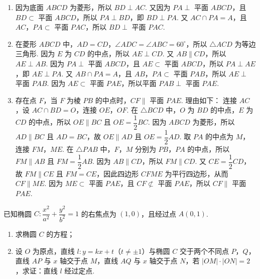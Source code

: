 \begin{solution}
\begin{enumerate}
\item 因为底面 \(ABCD\) 为菱形，所以 \(BD\perp AC\).
又因为 \(PA\perp\) 平面 \(ABCD\)，且 \(BD\subset\) 平面 \(ABCD\)，所以 \(PA\perp BD\)，即 \(BD\perp PA\).
又 \(AC\cap PA=A\)，且 \(AC\)，\(PA\subset\) 平面 \(PAC\)，所以 \(BD\perp\) 平面 \(PAC\).

\item 在菱形 \(ABCD\) 中，\(AD=CD\)，\(\angle ADC=\angle ABC=60^\circ\)，所以 \(\triangle ACD\) 为等边三角形.
因为 \(E\) 为 \(CD\) 的中点，所以 \(AE\perp CD\).
又 \(AB\parallel CD\)，所以 \(AE\perp AB\).
因为 \(PA\perp\) 平面 \(ABCD\)，且 \(AE\subset\) 平面 \(ABCD\)，所以 \(PA\perp AE\)，即 \(AE\perp PA\).
又 \(AB\cap PA=A\)，且 \(AB\)，\(PA\subset\) 平面 \(PAB\)，所以 \(AE\perp\) 平面 \(PAB\).
因为 \(AE\subset\) 平面 \(PAE\)，所以平面 \(PAB\perp\) 平面 \(PAE\).

\item 存在点 \(F\)，当 \(F\) 为棱 \(PB\) 的中点时，\(CF\parallel\) 平面 \(PAE\). 理由如下：
连接 \(AC\)，设 \(AC\cap BD=O\)，连接 \(OE\)，\(OF\).
在 \(\triangle BCD\) 中，\(O\) 为 \(BD\) 的中点，\(E\) 为 \(CD\) 的中点，所以 \(OE\parallel BC\) 且 \(OE=\dfrac12BC\).
因为 \(ABCD\) 为菱形，所以 \(AD\parallel BC\) 且 \(AD=BC\)，故 \(OE\parallel AD\) 且 \(OE=\dfrac12AD\).
取 \(PA\) 的中点为 \(M\)，连接 \(FM\)，\(ME\).
在 \(\triangle PAB\) 中，\(F\)，\(M\) 分别为 \(PB\)，\(PA\) 的中点，所以 \(FM\parallel AB\) 且 \(FM=\dfrac12AB\).
因为 \(AB\parallel CD\)，所以 \(FM\parallel CD\). 又 \(CE=\dfrac12CD\)，故 \(FM\parallel CE\) 且 \(FM=CE\)，因此四边形 \(CFME\) 为平行四边形，从而 \(CF\parallel ME\).
因为 \(ME\subset\) 平面 \(PAE\)，且 \(CF\not\subset\) 平面 \(PAE\)，所以 \(CF\parallel\) 平面 \(PAE\).
\end{enumerate}
\end{solution}

\begin{problem}
已知椭圆 \(C:\dfrac{x^2}{a^2}+\dfrac{y^2}{b^2}=1\) 的右焦点为 \((1,0)\)，且经过点 \(A(0,1)\).

\begin{enumerate}
\item 求椭圆 \(C\) 的方程；

\item 设 \(O\) 为原点，直线 \(l:y=kx+t\)（\(t\ne\pm1\)）与椭圆 \(C\) 交于两个不同点 \(P\)，\(Q\)，直线 \(AP\) 与 \(x\) 轴交于点 \(M\)，直线 \(AQ\) 与 \(x\) 轴交于点 \(N\)，若 \(\lvert OM\rvert\cdot\lvert ON\rvert=2\)，求证：直线 \(l\) 经过定点.
\end{enumerate}
\end{problem}

